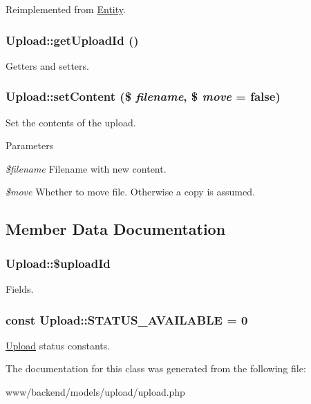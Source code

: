 Reimplemented from \hyperlink{classEntity_a8305fd94740ac62cbafb9de76567ce37}{Entity}.

\hypertarget{classUpload_aaf7fe1fb2d650ebd9e8a28354d1b23bc}{
\subsubsection[{getUploadId}]{\setlength{\rightskip}{0pt plus 5cm}Upload::getUploadId ()}}
\label{classUpload_aaf7fe1fb2d650ebd9e8a28354d1b23bc}
Getters and setters. \hypertarget{classUpload_a4a6ec727bce54cbe5e60ad19963f4cb4}{
\subsubsection[{setContent}]{\setlength{\rightskip}{0pt plus 5cm}Upload::setContent (\$ {\em filename}, \/  \$ {\em move} = {\ttfamily false})}}
\label{classUpload_a4a6ec727bce54cbe5e60ad19963f4cb4}
Set the contents of the upload.


\begin{DoxyParams}{Parameters}
\item[{\em \$filename}]Filename with new content. \item[{\em \$move}]Whether to move file. Otherwise a copy is assumed. \end{DoxyParams}


\subsection{Member Data Documentation}
\hypertarget{classUpload_a9757b15a3aa26eb0bfe3b995f49f5c60}{
\subsubsection[{\$uploadId}]{\setlength{\rightskip}{0pt plus 5cm}Upload::\$uploadId}}
\label{classUpload_a9757b15a3aa26eb0bfe3b995f49f5c60}
Fields. \hypertarget{classUpload_ae16403b6e7561efbc578b84dfd1d97ed}{
\subsubsection[{STATUS\_\-AVAILABLE}]{\setlength{\rightskip}{0pt plus 5cm}const {\bf Upload::STATUS\_\-AVAILABLE} = 0}}
\label{classUpload_ae16403b6e7561efbc578b84dfd1d97ed}
\hyperlink{classUpload}{Upload} status constants. 

The documentation for this class was generated from the following file:\begin{DoxyCompactItemize}
\item 
www/backend/models/upload/upload.php\end{DoxyCompactItemize}
